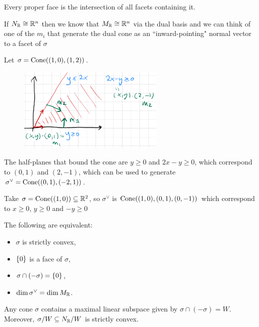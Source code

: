 \begin{fact}
Every proper face is the intersection of all facets containing it.
\end{fact}


\begin{remark}
If $N_{\mathbb{R}}\cong \mathbb{R}^n$ then we know that $M_{\mathbb{R}}\cong \mathbb{R}^n$ via the dual basis and we can think of one of the $m_i$ that generate the dual cone as an ``inward-pointing" normal vector to a facet of $\sigma$
\end{remark}


\begin{example}
Let $\sigma=\mathrm{Cone}((1,0),(1,2))$. 
\begin{figure}[!htb]
	\centering
	\includegraphics[width=7cm]{Images/Inward-facing-normals-for-dual-cone.png}
\end{figure}

\noindent
The half-planes that bound the cone are $y\geq 0$ and $2x-y\geq0$, which correspond to $(0,1)$ and $(2,-1)$, which can be used to generate $\sigma^\vee=\mathrm{Cone}((0,1),(-2,1))$.
\end{example}


\begin{example}
Take $\sigma=\mathrm{Cone}((1,0))\subseteq \mathbb{R}^2$, so $\sigma^\vee$ is $\mathrm{Cone}((1,0),(0,1),(0,-1))$ which correspond to $x\geq 0$, $y\geq 0$ and $-y\geq 0$
\end{example}

\begin{fact}
The following are equivalent:
\begin{itemize}
\item $\sigma$ is strictly convex,
\item $\left\{{0}\right\}$ is a face of $\sigma$,
\item $\sigma\cap (-\sigma)=\left\{{0}\right\}$,
\item $\dim \sigma^\vee=\dim M_{\mathbb{R}}$.
\end{itemize}
\end{fact}

\begin{fact}
Any cone $\sigma$ contains a maximal linear subspace given by $\sigma\cap (-\sigma)=W$. Moreover, $\sigma/W\subseteq N_{\mathbb{R}}/W$ is strictly convex.
\end{fact}


